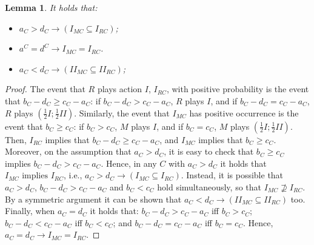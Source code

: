 \documentclass[fleqn,reqno,12pt]{article}
\theoremstyle{Satz}
\newtheorem{lemma}[theorem]{Lemma}
\theoremstyle{Bsp}
\begin{document}
\begin{lemma} \label{lemma:action implications}
It holds that:
  \begin{itemize}
  \item $a_{C}>d_{C}\rightarrow(I_{MC}\subseteq I_{RC})$;
  \item $a^{C}=d^{C}\rightarrow I_{MC}=I_{RC}$.
  \item $a_{C}<d_{C}\rightarrow(II_{MC}\subseteq II_{RC})$;
  \end{itemize}
\end{lemma}

\begin{proof}
The event that $R$ plays action $I$, $I_{RC}$, with positive probability is the event that $b_{C}-d_{C} \geq c_{C}-a_{C}$: if $b_{C}-d_{C}>c_{C}-a_{C}$, $R$ plays $I$, and if $b_{C}-d_{C}=c_{C}-a_{C}$, $R$ plays
  $(\frac{1}{2}I;\frac{1}{2}II)$. Similarly, the event that $I_{MC}$ has positive occurrence is the event that $b_{C} \geq c_{C}$: if $b_{C}>c_{C}$, $M$ plays $I$, and if
  $b_{C}=c_{C}$, $M$ plays $(\frac{1}{2}I;\frac{1}{2}II)$. 
Then, $I_{RC}$ implies that
  $b_{C}-d_{C}\geq c_{C}-a_{C}$, and $I_{MC}$ implies that $b_{C}\geq c_{C}$. Moreover, on the
  assumption that $a_{C}>d_{C}$, it is easy to check that $b_{C}\geq c_{C}$ implies
  $b_{C}-d_{C}>c_{C}-a_{C}$.  Hence, in any $C$ with $a_{C}>d_{C}$ it holds that
  $I_{MC}\mbox{ implies }I_{RC}$, i.e., $a_{C}>d_{C}\rightarrow(I_{MC}\subseteq I_{RC})$.
Instead, it is possible that $a_{C}>d_{C}$, $b_{C}-d_{C}>c_{C}-a_{C}$ and $b_{C}<c_{C}$ hold
  simultaneously, so that $I_{MC}\nsupseteq I_{RC}$.
By a symmetric argument it can be shown that
  $a_{C}<d_{C}\rightarrow(II_{MC}\subseteq II_{RC})$ too. Finally, when $a_{C}=d_{C}$ it holds
  that: $b_{C}-d_{C}>c_{C}-a_{C}$ iff $b_{C}>c_{C}$; $b_{C}-d_{C}<c_{C}-a_{C}$ iff
  $b_{C}<c_{C}$; and $b_{C}-d_{C}=c_{C}-a_{C}$ iff $b_{C}=c_{C}$. Hence,
  $a_{C}=d_{C}\rightarrow I_{MC}=I_{RC}$.
\end{proof}

\vspace{.5cm}
\end{document}
